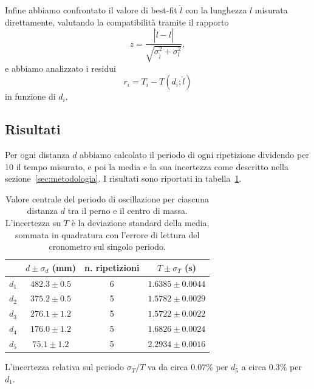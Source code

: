 \documentclass[a4paper]{article}
\begin{document}
Infine abbiamo confrontato il valore di best-fit $\hat{l}$ con la
lunghezza $l$ misurata direttamente, valutando la compatibilità tramite il
rapporto
\begin{equation}
  z = \frac{|\hat{l} - l|}{\sqrt{\sigma_{\hat{l}}^2 + \sigma_l^2}} ,
  \label{eq:z}
\end{equation}
e abbiamo analizzato i residui
\begin{equation}
  r_i = T_i - T(d_i;\hat{l})
  \label{eq:residui}
\end{equation}
in funzione di $d_i$.

\subsection{Risultati}\label{sec:risultati}

Per ogni distanza $d$ abbiamo calcolato il periodo di ogni ripetizione dividendo per 10 il tempo misurato, e poi la media e la sua incertezza come descritto nella sezione~\ref{sec:metodologia}. I risultati sono riportati in tabella~\ref{tab:periodi}.

\begin{table}[H]
    \centering
    \begin{tabular}{c|c|c|c}
      & $d\pm\sigma_d$ (mm) & n. ripetizioni & $T\pm\sigma_T$ (s)\\
      \hline
      $d_1$ & $482.3 \pm 0.5$ & 6 & $1.6385 \pm 0.0044$ \\
      $d_2$ & $375.2 \pm 0.5$ & 5 & $1.5782 \pm 0.0029$ \\
      $d_3$ & $276.1 \pm 1.2$ & 5 & $1.5722 \pm 0.0022$ \\
      $d_4$ & $176.0 \pm 1.2$ & 5 & $1.6826 \pm 0.0024$ \\
      $d_5$ & $75.1 \pm 1.2$  & 5 & $2.2934 \pm 0.0016$ \\
    \end{tabular}
    \caption{Valore centrale del periodo di oscillazione per ciascuna distanza $d$ tra il perno e il centro di massa. L'incertezza su $T$ è la deviazione standard della media, sommata in quadratura con l'errore di lettura del cronometro sul singolo periodo.}
    \label{tab:periodi}
\end{table}

\newpage
L'incertezza relativa sul periodo $\sigma_T/T$ va da circa $0.07\%$ per $d_5$ a circa $0.3\%$ per $d_1$.
\end{document}
